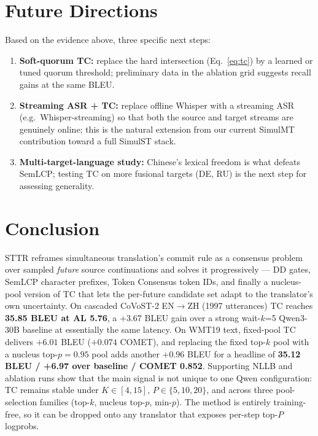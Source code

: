 \documentclass{article}
\begin{document}
\section{Future Directions}
\label{sec:future}

Based on the evidence above, three specific next steps:
\begin{enumerate}\itemsep0pt
\item \textbf{Soft-quorum TC:} replace the hard intersection
  (Eq.~\ref{eq:tc}) by a learned or tuned quorum threshold; preliminary data in the ablation
  grid suggests recall gains at the same BLEU.
\item \textbf{Streaming ASR + TC:} replace offline Whisper with a streaming ASR (e.g.\
  Whisper-streaming) so that both the source and target streams are genuinely online; this is
  the natural extension from our current SimulMT contribution toward a full SimulST stack.
\item \textbf{Multi-target-language study:} Chinese's lexical freedom is what defeats
  SemLCP; testing TC on more fusional targets (DE, RU) is the next step for assessing generality.
\end{enumerate}

\section{Conclusion}
\label{sec:conclusion}

STTR reframes simultaneous translation's commit rule as a consensus problem over sampled
\emph{future} source continuations and solves it progressively --- DD gates, SemLCP character
prefixes, Token Consensus token IDs, and finally a nucleus-pool version of TC that lets the
per-future candidate set adapt to the translator's own uncertainty. On cascaded CoVoST-2
EN$\rightarrow$ZH (1997 utterances) TC reaches \textbf{35.85 BLEU at AL 5.76}, a $+3.67$ BLEU
gain over a strong wait-$k$=5 Qwen3-30B baseline at essentially the same latency. On WMT19 text,
fixed-pool TC delivers $+6.01$ BLEU ($+0.074$ COMET), and replacing the fixed top-$k$ pool with
a nucleus top-$p{=}0.95$ pool adds another $+0.96$ BLEU for a headline of \textbf{35.12 BLEU /
+6.97 over baseline / COMET 0.852}. Supporting NLLB and ablation runs show that the main signal is
not unique to one Qwen configuration: TC remains stable under $K\in[4,15]$,
$P\in\{5,10,20\}$, and across three pool-selection families (top-$k$, nucleus top-$p$, min-$p$).
The method is entirely training-free, so it can be dropped onto any translator that exposes
per-step top-$P$ logprobs.
\end{document}
